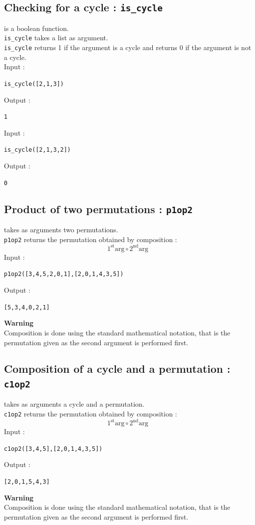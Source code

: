 \documentclass[a4paper,11pt]{book}
\begin{document}
\subsection{Checking for a cycle : {\tt is\_cycle}}
 is a boolean function.\\
{\tt is\_cycle} takes a list as argument.\\
{\tt is\_cycle} returns 1 if the argument is a cycle and returns 0 if the
argument is not a cycle.\\
Input :
\begin{center}{\tt is\_cycle([2,1,3]) }\end{center}
Output :
\begin{center}{\tt 1}\end{center}
Input :
\begin{center}{\tt is\_cycle([2,1,3,2]) }\end{center}
Output :
\begin{center}{\tt 0}\end{center}

\subsection{Product of two permutations : {\tt p1op2}}
 takes as arguments two permutations.\\
{\tt p1op2} returns the permutation obtained by composition :
\[ 1^{\mbox{st}}\mbox{arg} \circ 2^{\mbox{nd}} \mbox{arg} \]
Input :
\begin{center}{\tt p1op2([3,4,5,2,0,1],[2,0,1,4,3,5])}\end{center}
Output :
\begin{center}{\tt [5,3,4,0,2,1]}\end{center}
{\bf Warning}\\
Composition is done using the standard mathematical notation,
that is the permutation given as the second argument is performed first.

\subsection{Composition of a cycle and a permutation : {\tt c1op2}}
 takes as arguments a cycle and a permutation.\\
{\tt c1op2} returns the  permutation obtained by composition :
\[ 1^{\mbox{st}}\mbox{arg} \circ 2^{\mbox{nd}} \mbox{arg} \]
Input :
\begin{center}{\tt c1op2([3,4,5],[2,0,1,4,3,5])}\end{center}
Output :
\begin{center}{\tt [2,0,1,5,4,3]}\end{center}
{\bf Warning}\\
Composition is done using the standard mathematical notation,
that is the permutation given as the second argument is performed first.
\end{document}
